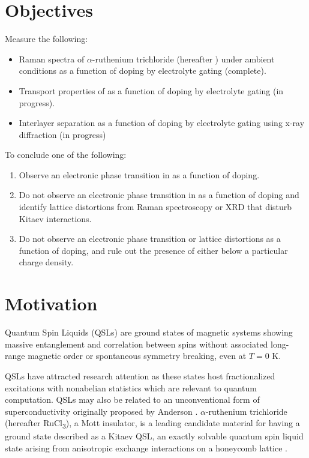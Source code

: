 \documentclass[11pt]{article}
\begin{document}
\section{Objectives}
Measure the following:
\begin{itemize}
	\item Raman spectra of $\alpha$-ruthenium trichloride (hereafter \rucl) under ambient conditions as a function of doping by electrolyte gating (complete).
	\item Transport properties of \rucl as a function of doping by electrolyte gating (in progress).
	\item Interlayer separation as a function of doping by electrolyte gating using x-ray diffraction (in progress)
\end{itemize}
To conclude one of the following:
\begin{enumerate}
	\item Observe an electronic phase transition in \rucl as a function of doping.
	\item Do not observe an electronic phase transition in \rucl as a function of doping and identify lattice distortions from Raman spectroscopy or XRD that disturb Kitaev interactions.
	\item Do not observe an electronic phase transition or lattice distortions as a function of doping, and rule out the presence of either below a particular charge density.
\end{enumerate}

\section{Motivation}
Quantum Spin Liquids (QSLs) are ground states of magnetic systems showing massive entanglement and correlation between spins without associated long-range magnetic order or spontaneous symmetry breaking, even at $T = 0$ K. 

QSLs have attracted research attention as these states host fractionalized excitations with nonabelian statistics \cite{Balents2010} which are relevant to quantum computation. QSLs may also be related to an unconventional form of superconductivity originally proposed by Anderson \cite{Lee2008}. $\alpha$-ruthenium trichloride (hereafter RuCl\textsubscript{3}), a Mott insulator, is a leading candidate material for having a ground state described as a Kitaev QSL, an exactly solvable quantum spin liquid state arising from anisotropic exchange interactions on a honeycomb lattice \cite{Kitaev2006}.
\end{document}
